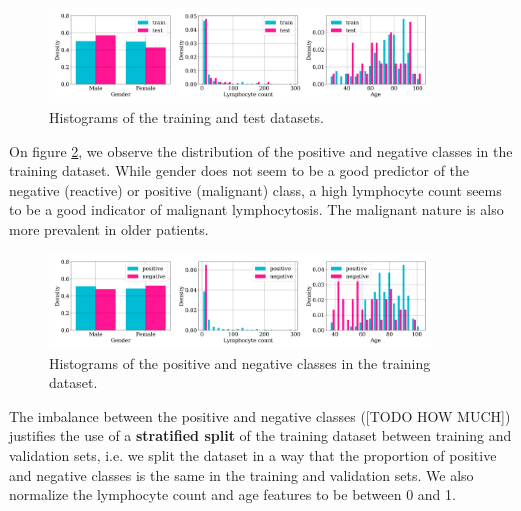 \documentclass{midl}
\begin{document}
\begin{figure}[h]
    \centering
    \includegraphics[width=0.9\textwidth]{figures/train_test_histograms.png}
    \caption{Histograms of the training and test datasets.}
    \label{fig:train_test_histograms}
\end{figure}

On figure \ref{fig:positive_negative_histograms}, we observe the distribution of the positive and negative classes in the training dataset. While gender does not seem to be a good predictor of the negative (reactive) or positive (malignant) class, a high lymphocyte count seems to be a good indicator of malignant lymphocytosis. The malignant nature is also more prevalent in older patients.

\begin{figure}[h]
    \centering
    \includegraphics[width=0.9\textwidth]{figures/positive_negative_histograms.png}
    \caption{Histograms of the positive and negative classes in the training dataset.}
    \label{fig:positive_negative_histograms}
\end{figure}

The imbalance between the positive and negative classes ([TODO HOW MUCH]) justifies the use of a \textbf{stratified split} of the training dataset between training and validation sets, i.e. we split the dataset in a way that the proportion of positive and negative classes is the same in the training and validation sets. We also normalize the lymphocyte count and age features to be between 0 and 1.
\end{document}
